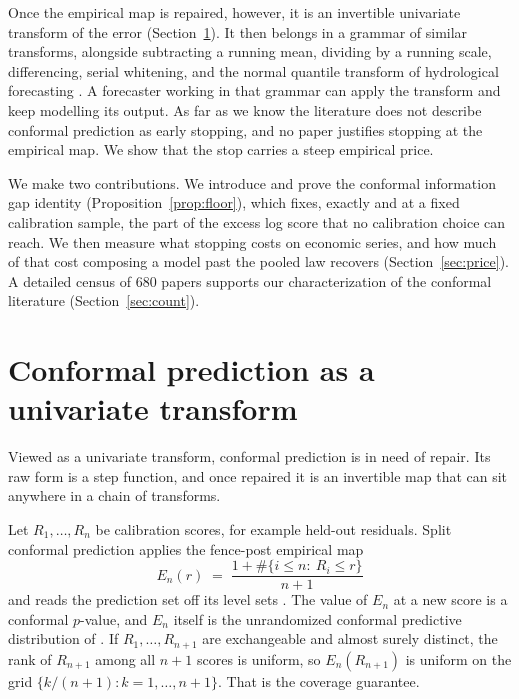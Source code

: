 \documentclass[11pt]{article}
\theoremstyle{remark}
\begin{document}
Once the empirical map is repaired, however, it is an
invertible univariate transform of the error (Section~\ref{sec:transform}). It then
belongs in a grammar of similar transforms, alongside subtracting a running mean,
dividing by a running scale, differencing, serial whitening, and the normal quantile
transform of hydrological forecasting \citep{bogner2012}. A forecaster working in that
grammar can apply the transform and keep modelling its output. As far as we know the
literature does not describe conformal prediction as early stopping, and no paper
justifies stopping at the empirical map. We show that the stop carries a steep
empirical price.

We make two contributions. We introduce and prove the conformal information gap
identity (Proposition~\ref{prop:floor}), which fixes, exactly and at a fixed
calibration sample, the part of the excess log score that no calibration choice can
reach. We then measure what stopping costs on economic series, and how much of that
cost composing a model past the pooled law recovers (Section~\ref{sec:price}). A
detailed census of 680 papers supports our characterization of the conformal
literature (Section~\ref{sec:count}).

\section{Conformal prediction as a univariate transform}\label{sec:transform}

Viewed as a univariate transform, conformal prediction is in need of repair. Its raw form is a step function, and once repaired it is an invertible map
that can sit anywhere in a chain of transforms.

Let $R_1,\dots,R_n$ be calibration scores, for example held-out residuals. Split
conformal prediction applies the fence-post empirical map
\begin{equation}\label{eq:fencepost}
E_n(r) \;=\; \frac{1+\#\{i\le n:\ R_i\le r\}}{n+1}
\end{equation}
and reads the prediction set off its level sets
\citep{vovk2005algorithmic,lei2018distribution}. The value of $E_n$ at a new score is
a conformal $p$-value, and $E_n$ itself is the unrandomized conformal predictive
distribution of \citet{vovk2019nonparametric}. If $R_1,\dots,R_{n+1}$ are
exchangeable and almost surely distinct, the rank of $R_{n+1}$ among all $n+1$
scores is uniform, so $E_n(R_{n+1})$ is uniform on the grid
$\{k/(n+1):k=1,\dots,n+1\}$. That is the coverage guarantee.
\end{document}
